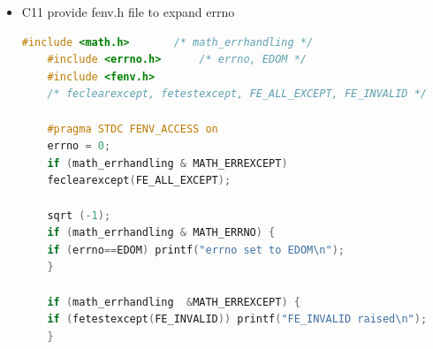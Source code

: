 \documentclass[a4paper,12pt,twoside]{book}
\begin{document}
\begin{itemize}
	\item C11 provide fenv.h file to expand errno
	\begin{lstlisting}[frame=single, language=c++]
	#include <math.h>       /* math_errhandling */
	#include <errno.h>      /* errno, EDOM */
	#include <fenv.h>
	/* feclearexcept, fetestexcept, FE_ALL_EXCEPT, FE_INVALID */
	
	#pragma STDC FENV_ACCESS on
	errno = 0;
	if (math_errhandling & MATH_ERREXCEPT)
	feclearexcept(FE_ALL_EXCEPT);
	
	sqrt (-1);
	if (math_errhandling & MATH_ERRNO) {
	if (errno==EDOM) printf("errno set to EDOM\n");
	}
	
	if (math_errhandling  &MATH_ERREXCEPT) {
	if (fetestexcept(FE_INVALID)) printf("FE_INVALID raised\n");
	}
	\end{lstlisting}
	
\end{itemize}
\end{document}
